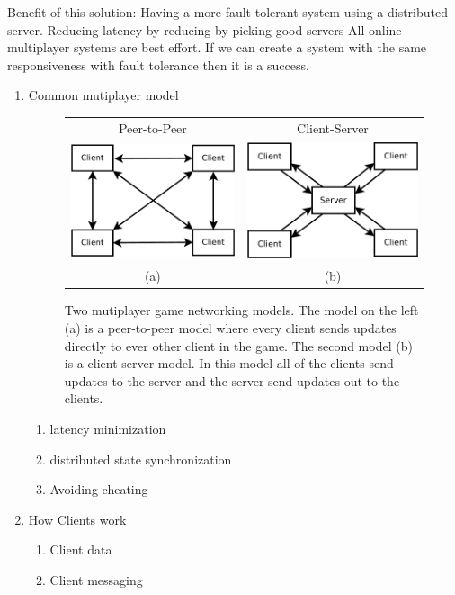 Benefit of this solution:
Having a more fault tolerant system using a distributed server. 
Reducing latency by reducing by picking good servers
All online multiplayer systems are best effort. If we can create a system with the same responsiveness with fault tolerance then it is a success.

\begin{enumerate}
	\item Common mutiplayer model
	\begin{figure}
	\centering
	\begin{tabular}{c c}
		Peer-to-Peer & Client-Server \\
		\includegraphics[width=0.48\linewidth]{../images/p2p-model-crop.pdf} &
		\includegraphics[width=0.48\linewidth]{../images/client-server-model-crop.pdf} \\
		(a) & (b)
	\end{tabular}

	\caption{\label{figure:p2p-vs-ClientServer} Two mutiplayer game networking models. The model on the left (a) is a peer-to-peer model where every client sends updates directly to ever other client in the game. The second model (b) is a client server model. In this model all of the clients send updates to the server and the server send updates out to the clients.}
	\end{figure}
	\begin{enumerate}
		\item latency minimization
		\item distributed state synchronization
		\item Avoiding cheating
	\end{enumerate}
	\item How Clients work
	\begin{enumerate}
		\item Client data
		\item Client messaging
	\end{enumerate}


\end{enumerate}
